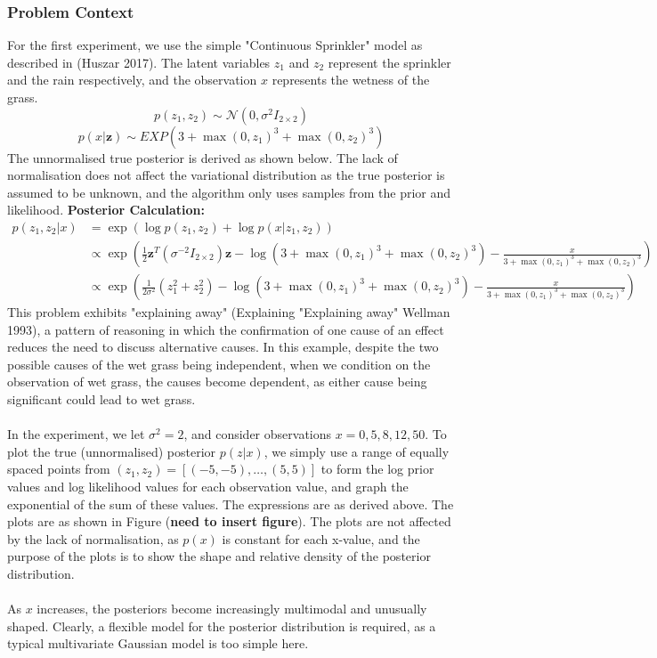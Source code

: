 \documentclass[a4paper,12pt]{article}
\newcommand{\N}{\mathcal{N}}
\numberwithin{equation}{section}
\begin{document}
\subsubsection{Problem Context}
For the first experiment, we use the simple "Continuous Sprinkler" model as described in (Huszar 2017). The latent variables $z_1$ and $z_2$ represent the sprinkler and the rain respectively, and the observation $x$ represents the wetness of the grass.
\[p(z_1,z_2)\sim \N (0,\sigma^2 I_{2\times 2})\]
\[p(x|\bm{z})\sim EXP(3+\max(0,z_1)^3+\max(0,z_2)^3)\]
The unnormalised true posterior is derived as shown below. The lack of normalisation does not affect the variational distribution as the true posterior is assumed to be unknown, and the algorithm only uses samples from the prior and likelihood.
\textbf{Posterior Calculation:}
\begin{align*}
p(z_1,z_2|x)&= \exp(\log p(z_1,z_2)+\log p(x|z_1,z_2))\\
&\propto\exp\left(\frac12\bm{z}^T(\sigma^{-2}I_{2\times 2})\bm{z}-\log (3+\max(0,z_1)^3+\max(0,z_2)^3)-\frac{x}{3+\max(0,z_1)^3+\max(0,z_2)^3}\right)\\
&\propto \exp\left(\frac{1}{2\sigma^2}(z_1^2+z_2^2)-\log (3+\max(0,z_1)^3+\max(0,z_2)^3)-\frac{x}{3+\max(0,z_1)^3+\max(0,z_2)^3}\right)
\end{align*}
This problem exhibits "explaining away" (Explaining "Explaining away" Wellman 1993), a pattern of reasoning in which the confirmation of one cause of an effect reduces the need to discuss alternative causes. In this example, despite the two possible causes of the wet grass being independent, when we condition on the observation of wet grass, the causes become dependent, as either cause being significant could lead to wet grass.\\
\\
In the experiment, we let $\sigma^2=2$, and consider observations $x=0,5,8,12,50$. To plot the true (unnormalised) posterior $p(z|x)$, we simply use a range of equally spaced points from $(z_1,z_2)=[(-5,-5),\dots, (5,5)]$ to form the log prior values and log likelihood values for each observation value, and graph the exponential of the sum of these values. The expressions are as derived above. The plots are as shown in Figure (\textbf{need to insert figure}). The plots are not affected by the lack of normalisation, as $p(x)$ is constant for each x-value, and the purpose of the plots is to show the shape and relative density of the posterior distribution.\\
\\
As $x$ increases, the posteriors become increasingly multimodal and unusually shaped. Clearly, a flexible model for the posterior distribution is required, as a typical multivariate Gaussian model is too simple here.
\end{document}
